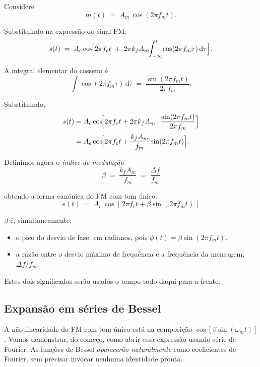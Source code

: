 \documentclass[11pt,a4paper]{article}
\newcommand{\dd}{\,\mathrm{d}}
\begin{document}
Considere
\[
  m(t) \;=\; A_m\,\cos(2\pi f_m t).
\]

\begin{quadro}
Substituindo na expressão do sinal FM:
\[
  s(t) \;=\; A_c \cos\!\Bigl[2\pi f_c t \;+\; 2\pi k_f A_m\!\!\int_{-\infty}^{t}\!\cos(2\pi f_m \tau)\dd\tau\Bigr].
\]

A integral elementar do cosseno é
\[
  \int \cos(2\pi f_m \tau)\dd\tau \;=\; \frac{\sin(2\pi f_m t)}{2\pi f_m}.
\]

Substituindo,
\begin{align*}
  s(t)
  &= A_c \cos\!\Bigl[2\pi f_c t + 2\pi k_f A_m \cdot \frac{\sin(2\pi f_m t)}{2\pi f_m}\Bigr] \\[2pt]
  &= A_c \cos\!\Bigl[2\pi f_c t + \frac{k_f A_m}{f_m}\sin(2\pi f_m t)\Bigr].
\end{align*}

Definimos agora o \emph{índice de modulação}
\[
  \boxed{\;\beta \;=\; \frac{k_f A_m}{f_m} \;=\; \frac{\Delta f}{f_m}\;}
\]

obtendo a forma canônica do FM com tom único:
\[
  \boxed{\;s(t) \;=\; A_c\,\cos[\,2\pi f_c t + \beta\sin(2\pi f_m t)\,]\;}
\]
\end{quadro}

\begin{observacao}
$\beta$ é, simultaneamente:
\begin{itemize}
  \item o pico do desvio de fase, em radianos, pois $\phi(t)=\beta\sin(2\pi f_m t)$.
  \item a razão entre o desvio máximo de frequência e a frequência da mensagem, $\Delta f/f_m$.
\end{itemize}
Estes dois significados serão usados o tempo todo daqui para a frente.
\end{observacao}

\subsection{Expansão em séries de Bessel}

A não linearidade do FM com tom único está na composição $\cos[\beta\sin(\omega_m t)]$. Vamos demonstrar, do começo, como abrir essa expressão usando série de Fourier. As funções de Bessel \emph{aparecerão naturalmente} como coeficientes de Fourier, sem precisar invocar nenhuma identidade pronta.
\end{document}
